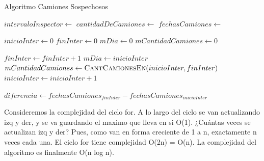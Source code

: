 \documentclass[11pt, a4paper, twoside]{article}
\begin{document}
\begin{algorithm}[H]
\caption{Algoritmo Camiones Sospechosos}\label{camionessospechosos}
\footnotesize\begin{algorithmic}[1]
  \Require
    \Statex $intervaloInspector \gets$  
    \Statex $cantidadDeCamiones \gets$  
    \Statex $fechasCamiones \gets$  
  \Ensure
    \Statex {} 
    \Statex {} 
  \Statex
  
  \State {} 
  \State $inicioInter \gets 0$ 
  \State $finInter \gets 0$ 
  \State $mDia \gets 0$ 
  \State $mCantidadCamiones \gets 0$ 

   
      \State $ finInter \gets finInter+1$
    \EndWhile 
   
    \State $ mDia \gets inicioInter$ 
    \State $ mCantidadCamiones \gets \Call{CantCamionesEn}{inicioInter,finInter}$ 
  \EndIf {}
  \State $inicioInter \gets inicioInter +1$
  \EndWhile {}
  \State {}
  \State


  \State {} 
  \EndFunction {}
  \State

    \State $diferencia \gets fechasCamiones_{finInter} - fechasCamiones_{inicioInter}$ 
    \State {} 
  \EndFunction {}

  \Statex{}
\end{algorithmic}
\end{algorithm}


Consideremos la complejidad del ciclo for. A lo largo del ciclo se van
actualizando izq y der, y se va guardando el maximo que lleva  en si O(1).
¿Cuántas veces se actualizan izq y der? Pues, como van en forma creciente de 1 a
n, exactamente n veces cada una. El ciclo for tiene complejidad O(2n) = O(n). La
complejidad del algoritmo es finalmente O(n log n).
\end{document}
